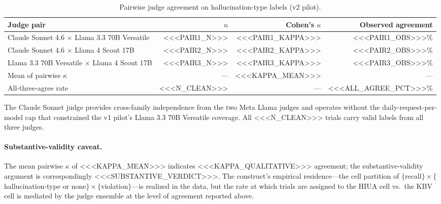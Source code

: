 \begin{table}[ht]
\centering
\caption{Pairwise judge agreement on hallucination-type labels (v2 pilot).}
\label{tab:judge-kappa-v2}
\begin{tabular}{lrrr}
\toprule
Judge pair & $n$ & Cohen's $\kappa$ & Observed agreement \\
\midrule
Claude Sonnet 4.6 $\times$ Llama 3.3 70B Versatile  & <<<PAIR1_N>>> & <<<PAIR1_KAPPA>>> & <<<PAIR1_OBS>>>\% \\
Claude Sonnet 4.6 $\times$ Llama 4 Scout 17B        & <<<PAIR2_N>>> & <<<PAIR2_KAPPA>>> & <<<PAIR2_OBS>>>\% \\
Llama 3.3 70B Versatile $\times$ Llama 4 Scout 17B  & <<<PAIR3_N>>> & <<<PAIR3_KAPPA>>> & <<<PAIR3_OBS>>>\% \\
\midrule
Mean of pairwise $\kappa$                            & --- & <<<KAPPA_MEAN>>> & --- \\
All-three-agree rate                                 & <<<N_CLEAN>>> & --- & <<<ALL_AGREE_PCT>>>\% \\
\bottomrule
\end{tabular}
\end{table}

The Claude Sonnet judge provides cross-family independence from the two Meta
Llama judges and operates without the daily-request-per-model cap that
constrained the v1 pilot's Llama 3.3 70B Versatile coverage. All
<<<N_CLEAN>>> trials carry valid labels from all three judges.

\paragraph{Substantive-validity caveat.}
The mean pairwise $\kappa$ of <<<KAPPA_MEAN>>> indicates
<<<KAPPA_QUALITATIVE>>> agreement; the substantive-validity argument is
correspondingly <<<SUBSTANTIVE_VERDICT>>>. The construct's empirical
residence---the cell partition of $\{$recall$\} \times \{$hallucination-type
or none$\} \times \{$violation$\}$---is realized in the data, but the rate
at which trials are assigned to the HIUA cell vs.\ the KBV cell is mediated
by the judge ensemble at the level of agreement reported above.


